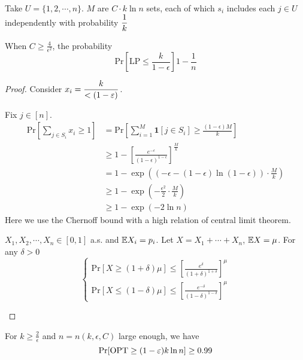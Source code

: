 
Take  $ U=\{1,2,\cdots,n\} $.  $ M  $ are  $ C\cdot  k\ln n $  sets, each of which  $ s_i $ includes each  $ j\in U $ independently with probability  $ \displaystyle\frac{1}{k} $   

\begin{claim}
    When  $ C \geq \frac{4}{\epsilon^2} $, the probability 
    \[\mathrm{Pr}[\mathrm{LP}  \leq \frac{k}{1-\epsilon}]1-\frac{1}{n}\]
\end{claim}
\begin{proof}
    Consider  $ x_i=\displaystyle\frac{k}{<(1-\varepsilon)} $.
    
    Fix  $ j\in [n] $.
    \begin{align*}
        \mathrm{Pr}[\sum_{j\in S_i}x_i \geq 1]&=\mathrm{Pr}\left[\sum_{i=1}^M\mathbf{1}[j\in S_i] \geq \frac{(1-\epsilon)M}{k}\right]\\
        & \geq 1-\left[\frac{e^{-\epsilon}}{(1-\epsilon)^{1-\epsilon}}\right]^{\frac{M}{k}}\\
        &=1-\exp\left((-\epsilon-(1-\epsilon)\ln (1-\epsilon))\cdot\frac{M}{k}\right)\\
        & \geq 1-\exp(-\frac{\epsilon^2}{2}\cdot\frac{M}{k})\\
        & \geq 1-\exp(-2\ln n)
    \end{align*} 
    Here we use the Chernoff bound with a high relation of central limit theorem.
    \begin{theorem}
        $ X_1,X_2,\cdots,X_n\in [0,1] $ a.s. and  $ \mathbb E X_i=p_i $. Let  $ X=X_1+\cdots+X_n $,  $ \mathbb E X=\mu $. For any  $ \delta>0 $
        \[\begin{cases}
            \mathrm{Pr}[X \geq (1+\delta)\mu] \leq \left[\frac{e^\delta}{(1+\delta)^{1+\delta}}\right]^\mu\\
            \mathrm{Pr}[X \leq (1-\delta)\mu] \leq \left[\frac{e^{-\delta}}{(1-\delta)^{1-\delta}}\right]^\mu
        \end{cases}\]    
    \end{theorem}
\end{proof}

\begin{claim}
    For  $ k \geq \frac{2}{\epsilon} $ and  $ n=n(k,\epsilon,C) $ large enough, we have 
    \[\mathrm{Pr}[\mathrm{OPT} \geq (1-\varepsilon)k\ln n] \geq 0.99\]  
\end{claim}

